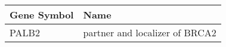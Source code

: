 \begin{tabular}{ll}
\toprule
Gene Symbol &                           Name \\
\midrule
      PALB2 & partner and localizer of BRCA2 \\
\bottomrule
\end{tabular}

